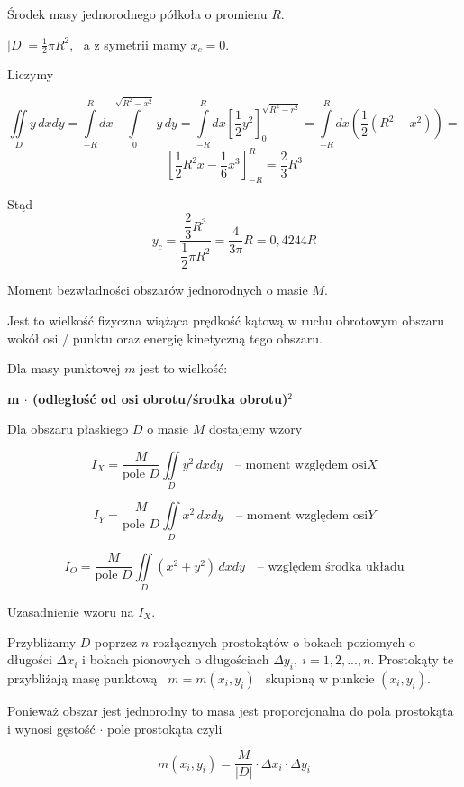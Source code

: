 \begin{przyklad}
    Środek masy jednorodnego półkoła o promienu $R$.

    $|D| = \frac{1}{2} \pi R^2$, \ a z symetrii mamy $x_c = 0$.

    Liczymy

    \[ \iint\limits_D y \, dxdy = \int\limits_{-R}^{R} dx \int\limits_{0}^{\sqrt{R^2 - x^2}} y \, dy = \int\limits_{-R}^{R} dx \left[ \frac{1}{2}y^2 \right]_{0}^{\sqrt{R^2 - r^2}} 
    = \int\limits_{-R}^{R} dx \left(\frac{1}{2}(R^2 - x^2) \right) = \] 
    \[ \left[ \frac{1}{2}R^2 x - \frac{1}{6}x^3 \right]_{-R}^{R} = \frac{2}{3}R^3 \]

    Stąd
    \[ y_c = \frac{\dfrac{2}{3}R^3}{\dfrac{1}{2}\pi R^2} = \frac{4}{3\pi}R = 0,4244 R \]
\end{przyklad}

Moment bezwładności obszarów jednorodnych o masie $M$.
\medskip

Jest to wielkość fizyczna wiążąca prędkość kątową w ruchu obrotowym obszaru wokół osi / punktu oraz energię kinetyczną tego obszaru.

Dla masy punktowej $m$ jest to wielkość:

\textbf{m $\cdot$ (odległość od osi obrotu/środka obrotu)$^2$} \medskip

Dla obszaru płaskiego $D$ o masie $M$ dostajemy wzory

\[ I_X = \frac{M}{\text{pole } D} \iint\limits_D y^2 \, dxdy \quad \text{-- moment względem osi} X\]

\[ I_Y = \frac{M}{\text{pole } D} \iint\limits_D x^2 \, dxdy \quad \text{-- moment względem osi} Y\]

\[ I_O = \frac{M}{\text{pole } D} \iint\limits_D (x^2 + y^2) \, dxdy \quad \text{-- względem środka układu}\]

Uzasadnienie wzoru na $I_X$. \bigskip

Przybliżamy $D$ poprzez $n$ rozłącznych prostokątów o bokach poziomych o długości $\Delta x_i$ i bokach pionowych o długościach $\Delta y_i, \ i = 1, 2, ..., n$.
Prostokąty te przybliżają masę punktową \linebreak \ $ m = m(x_i, y_i) $ \ skupioną w punkcie $(x_i, y_i)$. \bigskip

Ponieważ obszar jest jednorodny to masa jest proporcjonalna do pola prostokąta i wynosi gęstość $\cdot$ pole prostokąta czyli

\[ m(x_i, y_i) = \frac{M}{|D|} \cdot \Delta x_i \cdot \Delta y_i \]

